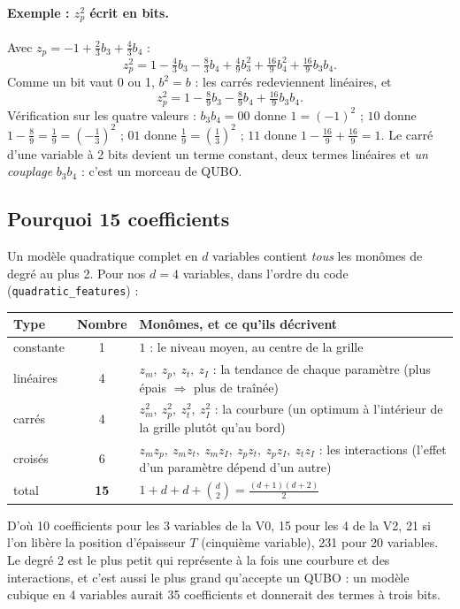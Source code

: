 \paragraph{Exemple : $z_p^2$ écrit en bits.} Avec $z_p=-1+\tfrac23b_3+\tfrac43b_4$ :
\[ z_p^2=1-\tfrac43b_3-\tfrac83b_4+\tfrac49b_3^2+\tfrac{16}9b_4^2+\tfrac{16}9b_3b_4. \]
Comme un bit vaut 0 ou 1, $b^2=b$ : les carrés redeviennent linéaires, et
\[ z_p^2=1-\tfrac89b_3-\tfrac89b_4+\tfrac{16}9b_3b_4. \]
Vérification sur les quatre valeurs : $b_3b_4=00$ donne $1=(-1)^2$ ; $10$ donne $1-\frac89=\frac19=(-\frac13)^2$ ; $01$ donne $\frac19=(\frac13)^2$ ; $11$ donne $1-\frac{16}9+\frac{16}9=1$. Le carré d'une variable à 2 bits devient un terme constant, deux termes linéaires et \emph{un couplage} $b_3b_4$ : c'est un morceau de QUBO.

\subsection{Pourquoi 15 coefficients}
Un modèle quadratique complet en $d$ variables contient \emph{tous} les monômes de degré au plus 2. Pour nos $d=4$ variables, dans l'ordre du code (\texttt{quadratic\_features}) :
\begin{center}
\renewcommand{\arraystretch}{1.2}
\small
\begin{tabularx}{\linewidth}{l c >{\raggedright\arraybackslash}X}
\toprule
Type & Nombre & Monômes, et ce qu'ils décrivent \\
\midrule
constante & 1 & $1$ : le niveau moyen, au centre de la grille \\
linéaires & 4 & $z_m,\ z_p,\ z_t,\ z_I$ : la tendance de chaque paramètre (plus épais $\Rightarrow$ plus de traînée) \\
carrés & 4 & $z_m^2,\ z_p^2,\ z_t^2,\ z_I^2$ : la courbure (un optimum à l'intérieur de la grille plutôt qu'au bord) \\
croisés & 6 & $z_mz_p,\ z_mz_t,\ z_mz_I,\ z_pz_t,\ z_pz_I,\ z_tz_I$ : les interactions (l'effet d'un paramètre dépend d'un autre) \\
\midrule
total & \textbf{15} & $1+d+d+\binom d2=\frac{(d+1)(d+2)}2$ \\
\bottomrule
\end{tabularx}
\end{center}
D'où 10 coefficients pour les 3 variables de la V0, 15 pour les 4 de la V2, 21 si l'on libère la position d'épaisseur $T$ (cinquième variable), 231 pour 20 variables. Le degré 2 est le plus petit qui représente à la fois une courbure et des interactions, et c'est aussi le plus grand qu'accepte un QUBO : un modèle cubique en 4 variables aurait 35 coefficients et donnerait des termes à trois bits.

